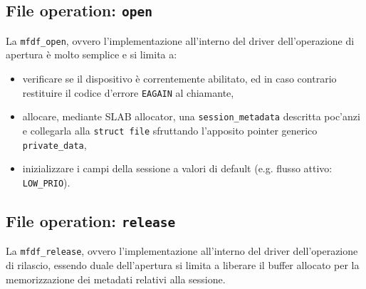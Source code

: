\documentclass{article}
\begin{document}
\subsection*{File operation: \texttt{open}}
La \texttt{mfdf\_open}, ovvero l'implementazione all'interno del driver dell'operazione di apertura è molto semplice e si limita a:
\begin{itemize}
        \item verificare se il dispositivo è correntemente abilitato, ed in caso contrario restituire il codice d'errore \texttt{EAGAIN} al chiamante,
        \item allocare, mediante SLAB allocator, una \texttt{session\_metadata} descritta poc'anzi e collegarla alla \texttt{struct file} sfruttando l'apposito pointer generico \texttt{private\_data},
        \item inizializzare i campi della sessione a valori di default (e.g. flusso attivo: \texttt{LOW\_PRIO}).
\end{itemize}

\subsection*{File operation: \texttt{release}}
La \texttt{mfdf\_release}, ovvero l'implementazione all'interno del driver dell'operazione di rilascio, essendo duale dell'apertura si limita a liberare il buffer allocato per la memorizzazione dei metadati relativi alla sessione.
\end{document}
